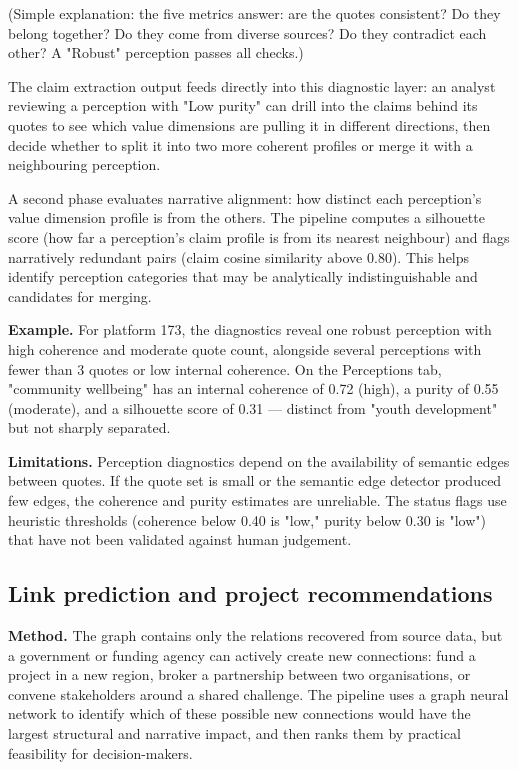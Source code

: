 \documentclass[11pt,a4paper]{article}
\begin{document}
(Simple explanation: the five metrics answer: are the quotes consistent?
Do they belong together? Do they come from diverse sources? Do they
contradict each other? A "Robust" perception passes all checks.)

The claim extraction output feeds directly into this diagnostic layer:
an analyst reviewing a perception with "Low purity" can drill into the
claims behind its quotes to see which value dimensions are pulling it in
different directions, then decide whether to split it into two more
coherent profiles or merge it with a neighbouring perception.

A second phase evaluates narrative alignment: how distinct each
perception's value dimension profile is from the others. The pipeline
computes a silhouette score (how far a perception's claim profile is
from its nearest neighbour) and flags narratively redundant pairs (claim
cosine similarity above 0.80). This helps identify perception categories
that may be analytically indistinguishable and candidates for merging.

\textbf{Example.} For platform 173, the diagnostics reveal one robust
perception with high coherence and moderate quote count, alongside
several perceptions with fewer than 3 quotes or low internal coherence.
On the Perceptions tab, "community wellbeing" has an internal coherence
of 0.72 (high), a purity of 0.55 (moderate), and a silhouette score of
0.31 — distinct from "youth development" but not sharply separated.

\textbf{Limitations.} Perception diagnostics depend on the availability of
semantic edges between quotes. If the quote set is small or the semantic
edge detector produced few edges, the coherence and purity estimates are
unreliable. The status flags use heuristic thresholds (coherence below
0.40 is "low," purity below 0.30 is "low") that have not been validated
against human judgement.

\subsection{Link prediction and project recommendations}

\textbf{Method.} The graph contains only the relations recovered from source
data, but a government or funding agency can actively create new
connections: fund a project in a new region, broker a partnership between
two organisations, or convene stakeholders around a shared challenge. The
pipeline uses a graph neural network to identify which of these possible
new connections would have the largest structural and narrative impact,
and then ranks them by practical feasibility for decision-makers.
\end{document}
